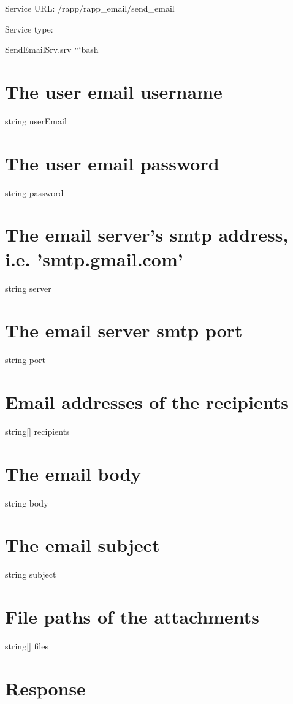 Service U\-R\-L\-: {\ttfamily /rapp/rapp\-\_\-email/send\-\_\-email}

Service type\-:

Send\-Email\-Srv.\-srv ```bash \section*{The user email username}

string user\-Email \section*{The user email password}

string password \section*{The email server's smtp address, i.\-e. 'smtp.\-gmail.\-com'}

string server \section*{The email server smtp port}

string port

\section*{Email addresses of the recipients}

string\mbox{[}\mbox{]} recipients

\section*{The email body}

string body \section*{The email subject}

string subject

\section*{File paths of the attachments}

string\mbox{[}\mbox{]} files 

 \section*{Response}

